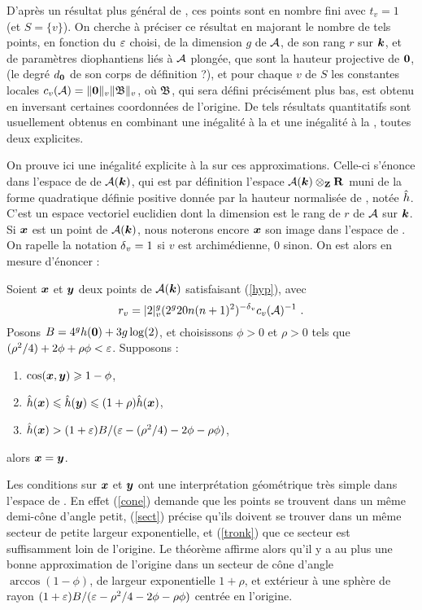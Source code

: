 \documentclass{mpg-preth}
\begin{document}
D'après un résultat plus général de , ces points sont en nombre
fini avec $t_v = 1$ (et $S= \{v\}$). On cherche à préciser ce résultat en
majorant le nombre de tels points, en fonction du $\varepsilon$ choisi, de la
dimension $g$ de $\mathcal{A}$, de son rang $r$ sur $\boldsymbol{k}$, et de paramètres
diophantiens liés à $\mathcal{A}$ plongée, que sont la hauteur projective de ${\boldsymbol{0}}$, (le
degré $d_{\boldsymbol{0}}$ de son corps de définition ?), et pour chaque $v$ de $S$ les
constantes locales $c_v(\mathcal{A}) = \lVert{\boldsymbol{0}}\rVert_{v}\lVert\mathfrak{B}\rVert_{v}$, où $\mathfrak{B}$, qui sera défini
précisément plus bas, est obtenu en inversant certaines coordonnées de
l'origine. De tels résultats quantitatifs sont usuellement obtenus en
combinant une inégalité à la  et une inégalité à la ,
toutes deux explicites.

On prouve ici une inégalité explicite à la  sur ces
approximations. Celle-ci s'énonce dans l'espace de  de
$\mathcal{A}(\boldsymbol{k})$, qui est par définition l'espace $\mathcal{A}(\boldsymbol{k})\otimes_{\mathbf{Z}} {\mathbf{R}}$ muni de la
forme quadratique définie positive donnée par la hauteur normalisée de
, notée $\hat{h}$. C'est un espace vectoriel euclidien dont la
dimension est le rang de  $r$ de $\mathcal{A}$ sur $\boldsymbol{k}$. Si ${\boldsymbol{x}}$
est un point de $\mathcal{A}(\boldsymbol{k})$, nous noterons encore ${\boldsymbol{x}}$ son image dans
l'espace de . On rapelle la notation ${\delta\smash{_v}} = 1$ si $v$ est
archimédienne, $0$ sinon. On est alors en mesure d'énoncer :

\begin{thm} \label{mumpt}
  Soient ${\boldsymbol{x}}$ et ${\boldsymbol{y}}$ deux points de $\mathcal{A}(\boldsymbol{k})$ satisfaisant (\ref{hyp}),
  avec
  \[
  r_v = \lvert2\rvert_{v}^g(2^g20n(n+1)^2)^{-{\delta\smash{_v}}} c_v(\mathcal{A})^{-1} \text{ .}
  \]
  Posons $B =
  4^gh({\boldsymbol{0}})+ 3g\log(2)$, et choisissons $\phi > 0$ et $\rho > 0$ tels que
  $(\rho^2/4) + 2\phi + \rho\phi< \varepsilon$. Supposons :
  \begin{enumerate}
  \item $\cos({\boldsymbol{x}},{\boldsymbol{y}}) \geqslant 1-\phi$, \label{cone}
  \item $\hat{h}({\boldsymbol{x}}) \leqslant \hat{h}({\boldsymbol{y}}) \leqslant (1+\rho)\hat{h}({\boldsymbol{x}})$, \label{sect}
  \item $\hat{h}({\boldsymbol{x}}) > (1+\varepsilon)B/(\varepsilon - (\rho^2/4) - 2\phi - \rho\phi)$,
    \label{tronk}
  \end{enumerate}
  alors ${\boldsymbol{x}} = {\boldsymbol{y}}$.
\end{thm}

Les conditions sur ${\boldsymbol{x}}$ et ${\boldsymbol{y}}$ ont une interprétation géométrique très
simple dans l'espace de . En effet (\ref{cone}) demande que
les points se trouvent dans un même demi-cône d'angle petit, (\ref{sect})
précise qu'ils doivent se trouver dans un même secteur de petite largeur
exponentielle, et (\ref{tronk}) que ce secteur est suffisamment loin de
l'origine. Le théorème affirme alors qu'il y a au plus une bonne approximation
de l'origine dans un secteur de cône d'angle $\arccos(1-\phi)$, de largeur
exponentielle $1+\rho$, et extérieur à une sphère de rayon $(1+\varepsilon)B/(\varepsilon -
\rho^2/4 - 2\phi - \rho\phi )$ centrée en l'origine.
\end{document}
